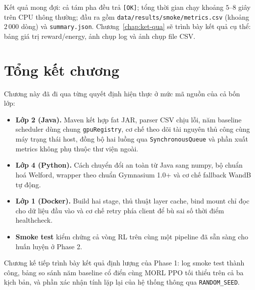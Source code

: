 Kết quả mong đợi: cả tám pha đều trả \texttt{[OK]}; tổng thời gian
chạy khoảng $5$--$8$ giây trên CPU thông thường; đầu ra gồm
\texttt{data/results/smoke/metrics.csv} (khoảng $2\,000$ dòng) và
\texttt{summary.json}. Chương~\ref{chap:ket-qua} sẽ trình bày kết
quả cụ thể: bảng giá trị reward/energy, ảnh chụp log và ảnh chụp
file CSV.

\section{Tổng kết chương}
\label{sec:ket-luan-c4}

Chương này đã đi qua từng quyết định hiện thực ở mức mã nguồn của
cả bốn lớp:
\begin{itemize}
  \item \textbf{Lớp 2 (Java).} Maven kết hợp fat JAR, parser CSV
        chịu lỗi, năm baseline scheduler dùng chung
        \texttt{gpuRegistry}, cơ chế theo dõi tài nguyên thủ
        công cùng máy trạng thái host, đồng bộ hai luồng qua
        \texttt{SynchronousQueue} và phần xuất metrics không
        phụ thuộc thư viện ngoài.
  \item \textbf{Lớp 4 (Python).} Cách chuyển đổi an toàn từ Java
        sang numpy, bộ chuẩn hoá Welford, wrapper theo chuẩn
        Gymnasium 1.0+ và cơ chế fallback WandB tự động.
  \item \textbf{Lớp 1 (Docker).} Build hai stage, thủ thuật
        layer cache, bind mount chỉ đọc cho dữ liệu đầu vào và
        cơ chế retry phía client để bù sai số thời điểm
        healthcheck.
  \item \textbf{Smoke test} kiểm chứng cả vòng RL trên cùng một
        pipeline đã sẵn sàng cho huấn luyện ở Phase 2.
\end{itemize}

Chương kế tiếp trình bày kết quả định lượng của Phase 1: log
smoke test thành công, bảng so sánh năm baseline cổ điển cùng
MORL PPO tối thiểu trên cả ba kịch bản, và phần xác nhận tính
lặp lại của hệ thống thông qua \texttt{RANDOM\_SEED}.

